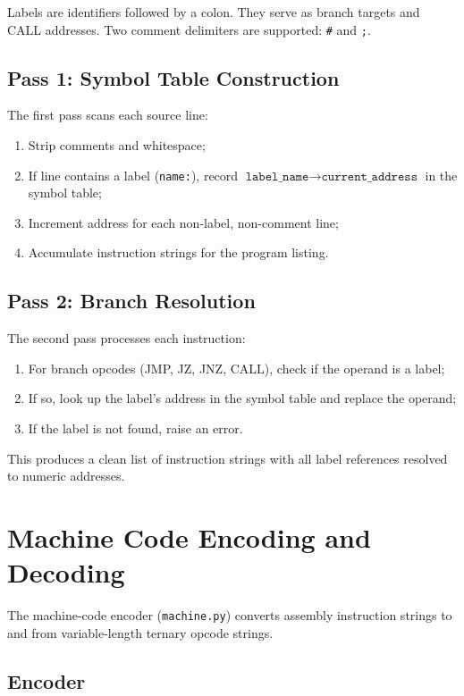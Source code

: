 \documentclass[10pt,a4paper,twoside]{book}
\begin{document}
Labels are identifiers followed by a colon. They serve as branch targets and CALL
addresses. Two comment delimiters are supported: \texttt{\#} and \texttt{;}.

\section{Pass 1: Symbol Table Construction}

The first pass scans each source line:
\begin{enumerate}
    \item Strip comments and whitespace;
    \item If line contains a label (\texttt{name:}), record $\texttt{label\_name}
          \rightarrow \texttt{current\_address}$ in the symbol table;
    \item Increment address for each non-label, non-comment line;
    \item Accumulate instruction strings for the program listing.
\end{enumerate}

\section{Pass 2: Branch Resolution}

The second pass processes each instruction:
\begin{enumerate}
    \item For branch opcodes (JMP, JZ, JNZ, CALL), check if the operand is a label;
    \item If so, look up the label's address in the symbol table and replace the
          operand;
    \item If the label is not found, raise an error.
\end{enumerate}

This produces a clean list of instruction strings with all label references resolved
to numeric addresses.

\chapter{Machine Code Encoding and Decoding}
\label{ch:machine}

The machine-code encoder (\texttt{machine.py}) converts assembly instruction strings
to and from variable-length ternary opcode strings.

\section{Encoder}
\end{document}
